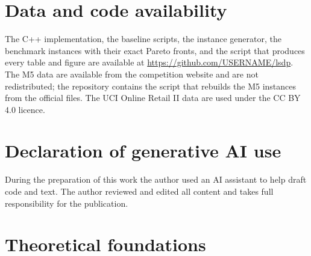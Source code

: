 \documentclass[preprint,12pt,authoryear]{elsarticle}
\begin{document}
\section*{Data and code availability}
The C++ implementation, the baseline scripts, the instance generator, the benchmark
instances with their exact Pareto fronts, and the script that produces every table and
figure are available at \url{https://github.com/USERNAME/lsdp}. The M5 data are available
from the competition website and are not redistributed; the repository contains the script
that rebuilds the M5 instances from the official files. The UCI Online Retail II data are
used under the CC BY 4.0 licence.

\section*{Declaration of generative AI use}
During the preparation of this work the author used an AI assistant to help draft
code and text. The author reviewed and edited all content and takes full responsibility
for the publication.

\appendix
\renewcommand{\thesection}{\Alph{section}}
\section{Theoretical foundations}\label{app:theory}




\end{document}
